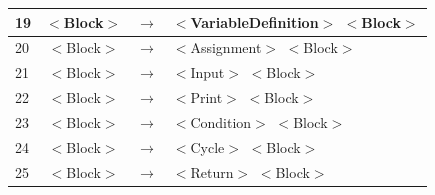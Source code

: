 \documentclass[10pt,a4paper,titlepage]{article}
\begin{document}
{\begin{center}
\begin{tabular}{ | l | c  c  l | }
      19 & $<$Block$>$                    & $\rightarrow$ & $<$VariableDefinition$>$ $<$Block$>$ \\ \hline
      20 & $<$Block$>$                    & $\rightarrow$ & $<$Assignment$>$ $<$Block$>$ \\ \hline
      21 & $<$Block$>$                    & $\rightarrow$ & $<$Input$>$ $<$Block$>$ \\ \hline
      22 & $<$Block$>$                    & $\rightarrow$ & $<$Print$>$ $<$Block$>$ \\ \hline
      23 & $<$Block$>$                    & $\rightarrow$ & $<$Condition$>$ $<$Block$>$ \\ \hline
      24 & $<$Block$>$                    & $\rightarrow$ & $<$Cycle$>$ $<$Block$>$ \\ \hline
      25 & $<$Block$>$                    & $\rightarrow$ & $<$Return$>$ $<$Block$>$ \\ \hline
    \end{tabular}
  \end{center}
}
\end{document}
